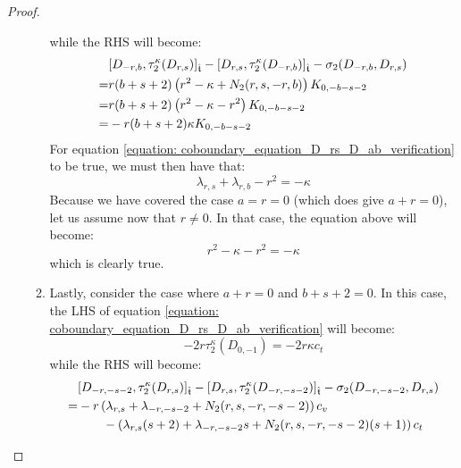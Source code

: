 \begin{proof}
\begin{enumerate}
\begin{enumerate}
$$                            $$
                        while the RHS will become:
                            $$
                                \begin{aligned}
                                    & [D_{-r, b}, \tau_2^{\kappa}(D_{r, s})]_{\extendedtoroidal} - [D_{r, s}, \tau_2^{\kappa}(D_{-r, b})]_{\extendedtoroidal} - \sigma_2(D_{-r, b}, D_{r, s})
                                    \\
                                    = & r (b + s + 2) \left( r^2 - \kappa + N_2(r, s, -r, b) \right) K_{0, -b - s - 2}
                                    \\
                                    = & r (b + s + 2) \left( r^2 - \kappa - r^2 \right) K_{0, -b - s - 2}
                                    \\
                                    = & -r (b + s + 2) \kappa K_{0, -b - s - 2}
                                \end{aligned}
                            $$
                        For equation \eqref{equation: coboundary_equation_D_rs_D_ab_verification} to be true, we must then have that:
                            $$\lambda_{r, s} + \lambda_{r, b} - r^2 = -\kappa$$
                        Because we have covered the case $a = r = 0$ (which does give $a + r = 0$), let us assume now that $r \not = 0$. In that case, the equation above will become:
                            $$r^2 - \kappa - r^2 = -\kappa$$
                        which is clearly true.
                        \item Lastly, consider the case where $a + r = 0$ and $b + s + 2 = 0$. In this case, the LHS of equation \eqref{equation: coboundary_equation_D_rs_D_ab_verification} will become:
                            $$-2r \tau_2^{\kappa}(D_{0, -1}) = -2r \kappa c_t$$
                        while the RHS will become:
                            $$
                                \begin{aligned}
                                    & [D_{-r, -s - 2}, \tau_2^{\kappa}(D_{r, s})]_{\extendedtoroidal} - [D_{r, s}, \tau_2^{\kappa}(D_{-r, -s - 2})]_{\extendedtoroidal} - \sigma_2(D_{-r, -s - 2}, D_{r, s})
                                    \\
                                    = &
                                        -r\left( \lambda_{r, s} + \lambda_{-r, -s - 2} + N_2(r, s, -r, -s - 2) \right) c_v
                                        \\
                                        & \qquad - \left( \lambda_{r, s} (s + 2) + \lambda_{-r, -s - 2} s + N_2(r, s, -r, -s - 2) (s + 1) \right) c_t

\end{aligned}$$
\end{enumerate}
\end{enumerate}
\end{proof}
